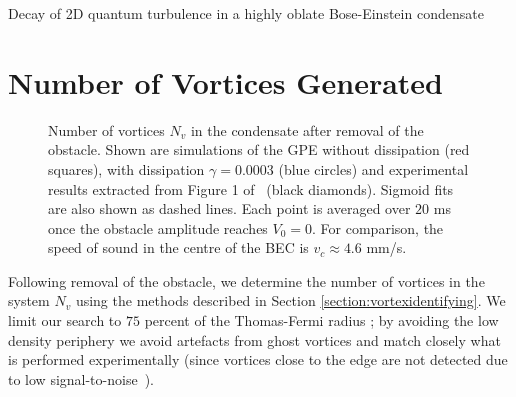 \begin{chapter}{\label{cha:shin}Decay of 2D quantum turbulence in a highly oblate Bose-Einstein condensate}
\section{Number of Vortices Generated}
\begin{figure}
\begin{center}
\end{center}
\caption{\label{fig:N_vV} Number of vortices $N_v$ in the condensate after removal of the obstacle. Shown are simulations of the GPE without dissipation (red squares), with dissipation $\gamma = 0.0003$ (blue circles) and experimental results extracted from Figure 1 of~\citep{kwon_moon_14} (black diamonds). Sigmoid fits are also shown as dashed lines. Each point is averaged over $20$ ms once the obstacle amplitude reaches $V_0=0$.  For comparison, the speed of sound in the centre of the BEC is $v_c\approx 4.6$ mm/s.  }
\end{figure} 
Following removal of the obstacle, we determine the number of vortices in the system $N_v$ using the methods described in Section \ref{section:vortexidentifying}.  
We limit our search to $75$ percent of the Thomas-Fermi radius ; by avoiding the low density periphery we avoid artefacts from ghost vortices and match closely what is performed experimentally (since vortices close to the edge are not detected due to low signal-to-noise~\citep{shin_private}). 


\end{chapter}
